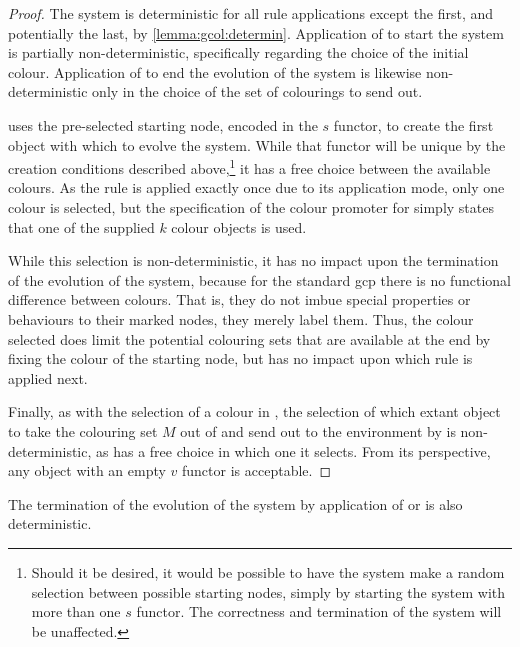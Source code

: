 \begin{proof}
The system is deterministic for all rule applications except the first, and potentially the last, by \cref{lemma:gcol:determin}.  Application of  to start the system is partially non-deterministic, specifically regarding the choice of the initial colour.  Application of  to end the evolution of the system is likewise non-deterministic only in the choice of the set of colourings to send out.

 uses the pre-selected starting node, encoded in the \(s\) functor, to create the first \bo{} object with which to evolve the system.  While that functor will be unique by the creation conditions described above,\footnote{Should it be desired, it would be possible to have the system make a random selection between possible starting nodes, simply by starting the system with more than one \(s\) functor.  The correctness and termination of the system will be unaffected.} it has a free choice between the available colours.  As the rule is applied exactly once due to its application mode, only one colour is selected, but the specification of the colour \gls{promoter} for  simply states that one of the supplied \(k\) colour objects is used.

While this selection is non-deterministic, it has no impact upon the termination of the evolution of the system, because for the standard \gls{gcp} there is no functional difference between colours.  That is, they do not imbue special properties or behaviours to their marked nodes, they merely label them.  Thus, the colour selected does limit the potential colouring sets that are available at the end by fixing the colour of the starting node, but has no impact upon which rule is applied next.

Finally, as with the selection of a colour in , the selection of which extant \bo{} object to take the colouring set \(M\) out of and send out to the environment by  is non-deterministic, as  has a free choice in which one it selects.  From its perspective, any \bo{} object with an empty \(v\) functor is acceptable.
\end{proof}

\begin{lemma}\label{lemma:gcol:ending}
The termination of the evolution of the system by application of  or  is also deterministic.
\end{lemma}

